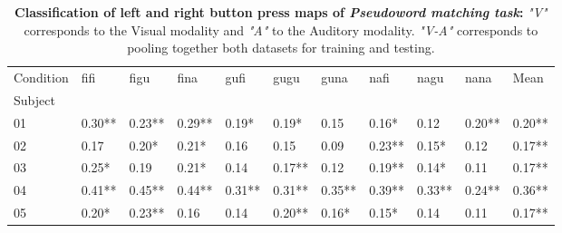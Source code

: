 \begin{table}
\begin{tabular}{lllllllllll}
\toprule
Condition &    fifi &    figu &    fina &    gufi &    gugu &    guna &    nafi &    nagu &    nana &    Mean \\
Subject &         &         &         &         &         &         &         &         &         &         \\
\midrule
01      &  0.30** &  0.23** &  0.29** &   0.19* &   0.19* &    0.15 &   0.16* &    0.12 &  0.20** &  0.20** \\
02      &    0.17 &   0.20* &   0.21* &    0.16 &    0.15 &    0.09 &  0.23** &   0.15* &    0.12 &  0.17** \\
03      &   0.25* &    0.19 &   0.21* &    0.14 &  0.17** &    0.12 &  0.19** &   0.14* &    0.11 &  0.17** \\
04      &  0.41** &  0.45** &  0.44** &  0.31** &  0.31** &  0.35** &  0.39** &  0.33** &  0.24** &  0.36** \\
05      &   0.20* &  0.23** &    0.16 &    0.14 &  0.20** &   0.16* &   0.15* &    0.14 &    0.11 &  0.17** \\
\bottomrule
\end{tabular}
\vspace{2ex}
\caption{\textbf{Classification of left and right button press maps of \emph{Pseudoword matching task}:} \emph{"V"} corresponds to the Visual modality and \emph{"A"} to the Auditory modality. \emph{"V-A"} corresponds to pooling together both datasets for training and testing.}
\label{table:visual_word_pred}
\end{table}

\vspace{30ex}


